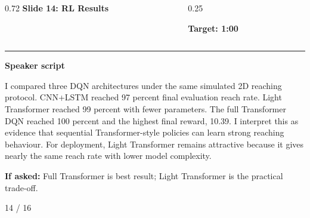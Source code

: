 \documentclass[aspectratio=169,10pt]{beamer}
\begin{document}
\begin{frame}[plain]
\vspace*{0.16cm}
\begin{columns}[T,totalwidth=\textwidth]
\begin{column}{0.72\textwidth}
{\fontsize{17}{18.5}\selectfont\bfseries Slide 14: RL Results}
\end{column}
\begin{column}{0.25\textwidth}
\raggedleft
\colorbox{noteCream}{\parbox{0.88\linewidth}{\centering\bfseries Target: 1:00}}
\end{column}
\end{columns}
\vspace{0.10cm}
{\color{uomPurple}\rule{\textwidth}{1.2pt}}
\vspace{0.18cm}
{\color{uomPurple}\bfseries Speaker script}
\vspace{0.06cm}
\setlength{\fboxsep}{6pt}
\noindent\colorbox{panelGrey}{\begin{minipage}{0.94\textwidth}
\justifying\fontsize{11.0}{13.4}\selectfont
I compared three DQN architectures under the same simulated 2D reaching protocol. CNN+LSTM reached 97 percent final evaluation reach rate. Light Transformer reached 99 percent with fewer parameters. The full Transformer DQN reached 100 percent and the highest final reward, 10.39. I interpret this as evidence that sequential Transformer-style policies can learn strong reaching behaviour. For deployment, Light Transformer remains attractive because it gives nearly the same reach rate with lower model complexity.
\end{minipage}}
\vspace{0.22cm}
\noindent\colorbox{noteCream}{\begin{minipage}{0.94\textwidth}
\fontsize{9.6}{11.6}\selectfont
{\bfseries If asked:} Full Transformer is best result; Light Transformer is the practical trade-off.
\end{minipage}}
\vfill
\hfill{\color{textDark}\scriptsize 14 / 16}
\end{frame}
\end{document}
